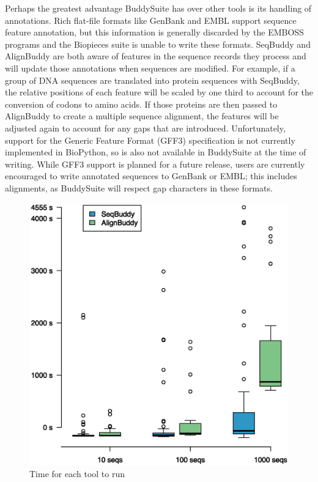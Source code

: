 \documentclass[nogrid]{MBE_article}%
\begin{document}
Perhaps the greatest advantage BuddySuite has over other tools is its handling of annotations. Rich flat-file formats like GenBank and EMBL support sequence feature annotation, but this information is generally discarded by the EMBOSS programs and the Biopieces suite is unable to write these formats. SeqBuddy and AlignBuddy are both aware of features in the sequence records they process and will update those annotations when sequences are modified. For example, if a group of DNA sequences are translated into protein sequences with SeqBuddy, the relative positions of each feature will be scaled by one third to account for the conversion of codons to amino acids. If those proteins are then passed to AlignBuddy to create a multiple sequence alignment, the features will be adjusted again to account for any gaps that are introduced. Unfortunately, support for the Generic Feature Format (GFF3) specification is not currently implemented in BioPython, so is also not available in BuddySuite at the time of writing. While GFF3 support is planned for a future release, users are currently encouraged to write annotated sequences to GenBank or EMBL; this includes alignments, as BuddySuite will respect gap characters in these formats.

\begin{figure}[t]
\begin{center}
\includegraphics[height=0.4\textheight]{figures/timeit.eps}
\end{center}
\caption{Time for each tool to run}%
\label{fig:timeit}%
\end{figure}
\end{document}
